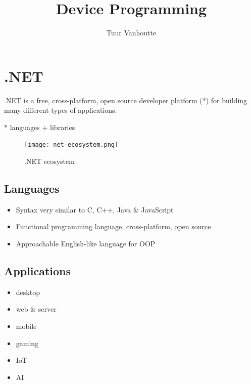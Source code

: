 \documentclass{article}
\begin{document}
\begin{titlepage}
    \author{Tuur Vanhoutte}
    \title{Device Programming}
\end{titlepage}

\maketitle
\newpage
\tableofcontents
\newpage


\section{.NET}

.NET is a free, cross-platform, open source developer platform (*) for building many different types of applications.

* languages + libraries

\begin{figure}[H]
    \centering
    \texttt{[image: net-ecosystem.png]}
    \caption{.NET ecosystem}
\end{figure}

\subsection{Languages}

\begin{itemize}
    \item Syntax very similar to C, C++, Java \& JavaScript
    \item Functional programming language, cross-platform, open source
    \item Approachable English-like language for OOP
\end{itemize}

\subsection{Applications}

\begin{itemize}
    \item desktop
    \item web \& server
    \item mobile
    \item gaming
    \item IoT
    \item AI
\end{itemize}
\end{document}
